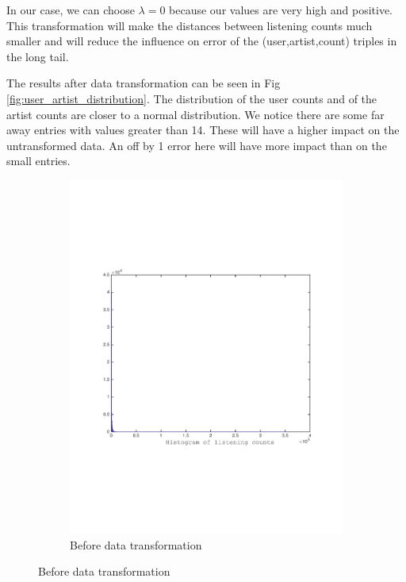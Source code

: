 In our case, we can choose $\lambda=0$ because our values are very high and positive. This transformation will make the distances between listening counts much smaller and will reduce the influence on error of the (user,artist,count) triples in the long tail. 

The results after data transformation can be seen in Fig \ref{fig:user_artist_distribution}. The distribution of the user counts and of the artist counts are closer to a normal distribution. We notice there are some far away entries with values greater than 14. These will have a higher impact on the untransformed data. An off by 1 error here will have more impact than on the small entries.

\begin{figure}[h]
  \centering
  \begin{subfigure}[b]{0.45\textwidth}
   \includegraphics[width=\textwidth]{figures/histYtrain_crop.pdf}
    \caption{Before data transformation}
  \end{subfigure}

\end{figure}

